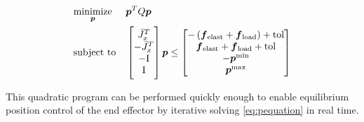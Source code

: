 \begin{equation}
\begin{aligned}
    & \underset{\p}{\text{minimize}}
    & & \p^T Q \p \\
    & \text{subject to}
    & & \mtx{\J_x^T \\ 
            -\J_x^T \\
            -\text{I} \\ \text{I}} \p
        \leq 
        \mtx{- \left( \f_{\tx{elast}} + \f_\tx{load} \right) + \text{tol} \\
            \f_{\tx{elast}} + \f_\tx{load} + \text{tol} \\
            -\p^\text{min} \\ \p^\text{max}}
\end{aligned}
\end{equation}

This quadratic program can be performed quickly enough to enable equilibrium position control of the end effector by iterative solving \eqref{eq:pequation} in real time.

















































